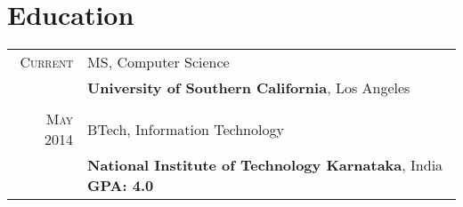 \documentclass[a4paper]{article} %
\begin{document}
\section{Education}
\begin{tabular}{rl}	

\textsc{Current} & MS, Computer Science\\
&\textbf{University of Southern California}, Los Angeles\\
\\
\textsc{May} 2014 & BTech, Information Technology\\
&\textbf{National Institute of Technology Karnataka}, India\hspace{2cm} \textbf{GPA: 4.0}

\end{tabular}

\end{document}
